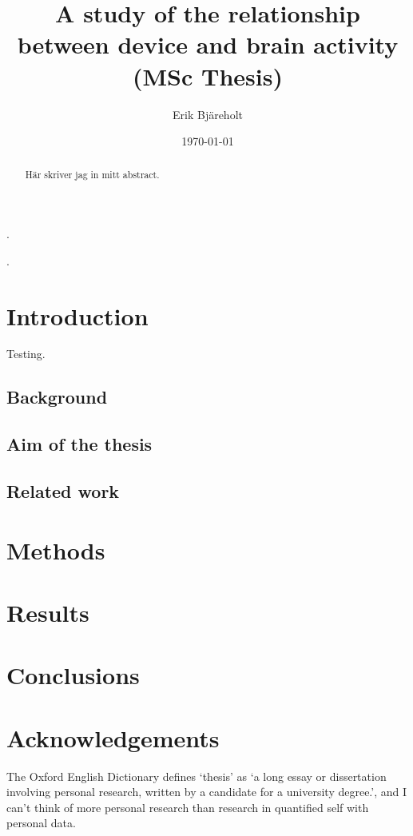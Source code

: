 \documentclass[a4paper]{article}
\title{A study of the relationship between device and brain activity (MSc Thesis)}
\author{Erik Bjäreholt}
\date{\today}
\begin{document}
\maketitle

\begin{abstract}
Här skriver jag in mitt abstract.
\end{abstract}

\pagebreak.\pagebreak

\tableofcontents

\pagebreak.\pagebreak

\section{Introduction}

Testing.

\subsection{Background}

\subsection{Aim of the thesis}

\subsection{Related work}

\section{Methods}

\section{Results}

\section{Conclusions}

\section*{Acknowledgements}

The Oxford English Dictionary defines `thesis' as `a long essay or dissertation involving personal research, written by a candidate for a university degree.', and I can't think of more personal research than research in quantified self with personal data.
\end{document}
